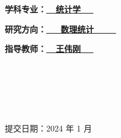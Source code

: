 \documentclass[a4paper,12pt,openany,oneside,utf-8]{ctexbook}
\newcommand{\sanhao}{\fontsize{15.75pt}{\baselineskip}\selectfont}
\begin{document}
\begin{titlepage}
\begin{center}
\textbf{\kaishu\sanhao 学科专业：\underline{\quad \quad \quad \ \ 统计学 \ \ \quad \quad \quad}}
\end{center}


\begin{center}
\textbf{\kaishu\sanhao 研究方向：\underline{\quad \quad \ \ \ 数理统计 \ \ \ \ \quad \quad}}
\end{center}

\begin{center}
\textbf{\kaishu\sanhao 指导教师：\underline{\quad \quad \quad \ \  王伟刚 \ \ \quad \quad \quad  }}
\end{center}

\

\

\


\begin{center}
\kaishu\sanhao 提交日期：2024 年 1 月
\end{center}
\end{titlepage}



% 
















\end{document}
